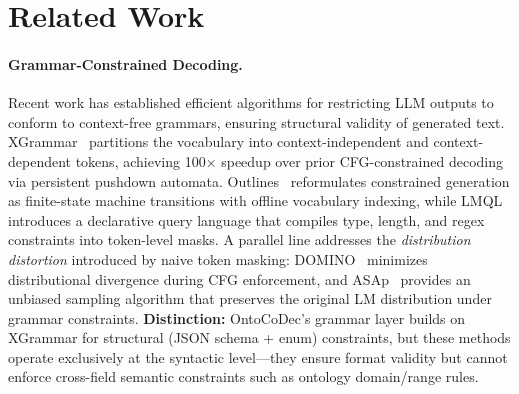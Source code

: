 \section{Related Work}
\label{sec:related_work}

\paragraph{Grammar-Constrained Decoding.}
Recent work has established efficient algorithms for restricting LLM outputs to conform to context-free grammars, ensuring structural validity of generated text.
%
XGrammar~\cite{dong2025xgrammar} partitions the vocabulary into context-independent and context-dependent tokens, achieving 100$\times$ speedup over prior CFG-constrained decoding via persistent pushdown automata.
%
Outlines~\cite{willard2023outlines} reformulates constrained generation as finite-state machine transitions with offline vocabulary indexing, while LMQL~\cite{beurer-kellner2023lmql} introduces a declarative query language that compiles type, length, and regex constraints into token-level masks.
%
A parallel line addresses the \emph{distribution distortion} introduced by naive token masking: DOMINO~\cite{beurer-kellner2024domino} minimizes distributional divergence during CFG enforcement, and ASAp~\cite{park2024grammar} provides an unbiased sampling algorithm that preserves the original LM distribution under grammar constraints.
%
\textbf{Distinction:} OntoCoDec's grammar layer builds on XGrammar for structural (JSON schema + enum) constraints, but these methods operate exclusively at the syntactic level---they ensure format validity but cannot enforce cross-field semantic constraints such as ontology domain/range rules.


